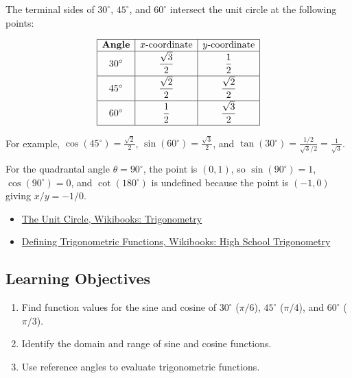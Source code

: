 The terminal sides of $30^{\circ}$, $45^{\circ}$, and $60^{\circ}$ intersect
the unit circle at the following points:

\[
  \begin{array}{|c|c|c|}
    \hline
    \textbf{Angle} & x\text{-coordinate} & y\text{-coordinate} \\
    \hline
    30^{\circ} & \dfrac{\sqrt{3}}{2} & \dfrac{1}{2} \\[6pt]
    \hline
    45^{\circ} & \dfrac{\sqrt{2}}{2} & \dfrac{\sqrt{2}}{2} \\[6pt]
    \hline
    60^{\circ} & \dfrac{1}{2} & \dfrac{\sqrt{3}}{2} \\[6pt]
    \hline
  \end{array}
\]

For example, $\cos(45^{\circ}) = \frac{\sqrt{2}}{2}$,
$\sin(60^{\circ}) = \frac{\sqrt{3}}{2}$, and
$\tan(30^{\circ}) = \frac{1/2}{\sqrt{3}/2} = \frac{1}{\sqrt{3}}$.

For the quadrantal angle $\theta = 90^{\circ}$, the point is $(0, 1)$, so
$\sin(90^{\circ}) = 1$, $\cos(90^{\circ}) = 0$, and $\cot(180^{\circ})$ is
undefined because the point is $(-1, 0)$ giving $x/y = -1/0$.

\begin{itemize}
  \item \href{https://en.wikibooks.org/wiki/Trigonometry/The_Unit_Circle}{The Unit Circle, Wikibooks: Trigonometry}
  \item \href{https://en.wikibooks.org/wiki/High_School_Trigonometry/Defining_Trigonometric_Functions}{Defining Trigonometric Functions, Wikibooks: High School Trigonometry}
\end{itemize}

\subsection{Learning Objectives}
\label{ssec:lear-fe6e}

\begin{enumerate}
    \item Find function values for the sine and cosine of $30^{\circ}$ ($\pi/6$), $45^{\circ}$ ($\pi/4$), and $60^{\circ}$ ($\pi/3$).
    \item Identify the domain and range of sine and cosine functions.
    \item Use reference angles to evaluate trigonometric functions.
\end{enumerate}

